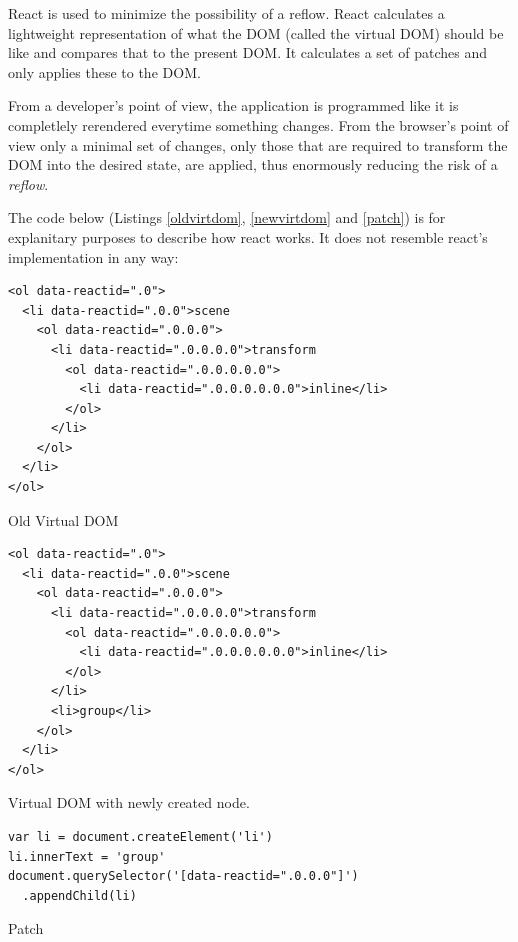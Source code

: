 React is used to minimize the possibility of a reflow. React
calculates a lightweight representation of what the \gls{DOM} (called the virtual DOM) should be like and
compares that to the present \gls{DOM}. It calculates a set of patches and
only applies these to the \gls{DOM}.

From a developer's point of view, the application is programmed like it is
completlely rerendered everytime something changes. From the browser's point
of view only a minimal set of changes, only those that are required to transform the
\gls{DOM} into the desired state, are applied, thus enormously reducing the risk of a \emph{reflow}.

The code below (Listings \ref{oldvirtdom}, \ref{newvirtdom} and \ref{patch}) is
for explanitary purposes to describe how react works. It does not resemble
react's implementation in any way:

\begin{listing}[H]
  \begin{verbatim}
<ol data-reactid=".0">
  <li data-reactid=".0.0">scene
    <ol data-reactid=".0.0.0">
      <li data-reactid=".0.0.0.0">transform
        <ol data-reactid=".0.0.0.0.0">
          <li data-reactid=".0.0.0.0.0.0">inline</li>
        </ol>
      </li>
    </ol>
  </li>
</ol>
  \end{verbatim}
  \caption{Old Virtual DOM}
  \label{oldvirtdom}
\end{listing}

\begin{listing}[H]
  \begin{verbatim}
<ol data-reactid=".0">
  <li data-reactid=".0.0">scene
    <ol data-reactid=".0.0.0">
      <li data-reactid=".0.0.0.0">transform
        <ol data-reactid=".0.0.0.0.0">
          <li data-reactid=".0.0.0.0.0.0">inline</li>
        </ol>
      </li>
      <li>group</li>
    </ol>
  </li>
</ol>
  \end{verbatim}
  \caption{Virtual DOM with newly created  node.}
  \label{newvirtdom}
\end{listing}

\begin{listing}[H]
  \begin{verbatim}
var li = document.createElement('li')
li.innerText = 'group'
document.querySelector('[data-reactid=".0.0.0"]')
  .appendChild(li)
  \end{verbatim}
  \caption{Patch}
  \label{patch}
\end{listing}

